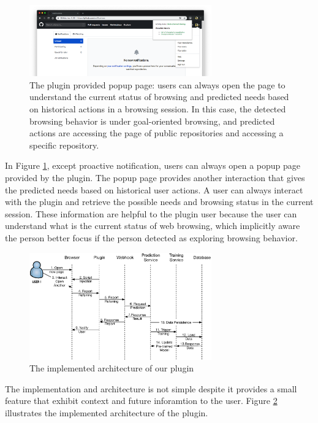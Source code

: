 \begin{figure}[H]
    \centering
    \includegraphics[width=0.7\textwidth]{figures/plugin-predicting-result}
    \caption{The plugin provided popup page: users can always open the page
    to understand the current status of browsing and predicted needs based on
    historical actions in a browsing session. In this case, the detected browsing behavior
    is under goal-oriented browsing, and predicted actions
    are accessing the page of public repositories and accessing a specific repository.}
    \label{fig:plugin-predict}
\end{figure}

In Figure \ref{fig:plugin-predict}, except proactive notification, 
users can always open a popup page provided by the plugin.
The popup page provides another interaction that gives the predicted needs 
based on historical user actions. A user can always interact with the plugin and
retrieve the possible needs and browsing status in the current session.
These information are helpful to the plugin user because the user can understand
what is the current status of web browsing, which implicitly aware the person better focus
if the person detected as exploring browsing behavior.

\begin{figure}[H]
    \centering
    \includegraphics[width=0.7\textwidth]{figures/arch}
    \caption{The implemented architecture of our plugin}
    \label{fig:arch}
\end{figure}

The implementation and architecture is not simple
despite it provides a small feature that exhibit context and future inforamtion to the user.
Figure \ref{fig:arch} illustrates the implemented architecture of the plugin.

